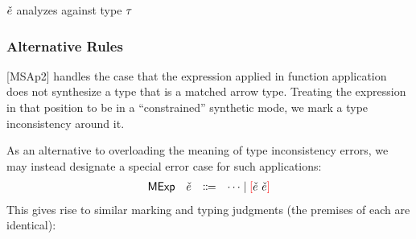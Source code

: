 \documentclass{article}
\begin{document}
\judgbox{\ctxAnaType{\ctx}{\ECMV}{\TMV}} $\ECMV$ analyzes against type $\TMV$
%
\begin{mathpar}



\end{mathpar}

\subsubsection{Alternative Rules}
[MSAp2] handles the case that the expression applied in function application does not synthesize a
type that is a matched arrow type. Treating the expression in that position to be in a
``constrained'' synthetic mode, we mark a type inconsistency around it.

As an alternative to overloading the meaning of type inconsistency errors, we may instead designate
a special error case for such applications:
%
\[\begin{array}{rrcl}
  \ECMName & \ECMV & \Coloneqq & \cdots \mid \ECNonMatchedAp{\ECMV}{\ECMV}
\end{array}\]
%
This gives rise to similar marking and typing judgments (the premises of each are identical):
%
\begin{mathpar}

\end{mathpar}
\end{document}
